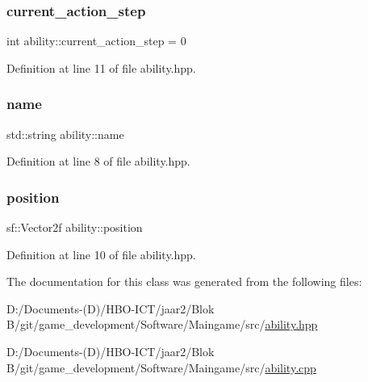 \mbox{\label{classability_a5dbf426e4716c3cc09a8ec0dafb148a0}} 
\subsubsection{\texorpdfstring{current\+\_\+action\+\_\+step}{current\_action\_step}}
{\footnotesize\ttfamily int ability\+::current\+\_\+action\+\_\+step = 0\hspace{0.3cm}{\ttfamily [private]}}



Definition at line 11 of file ability.\+hpp.

\mbox{\label{classability_a0064d2793f684924720a08b059ec2ee0}} 
\subsubsection{\texorpdfstring{name}{name}}
{\footnotesize\ttfamily std\+::string ability\+::name\hspace{0.3cm}{\ttfamily [private]}}



Definition at line 8 of file ability.\+hpp.

\mbox{\label{classability_a36d5b1ac8a8a2df0f1790f3ddf320fad}} 
\subsubsection{\texorpdfstring{position}{position}}
{\footnotesize\ttfamily sf\+::\+Vector2f ability\+::position\hspace{0.3cm}{\ttfamily [private]}}



Definition at line 10 of file ability.\+hpp.



The documentation for this class was generated from the following files\+:\begin{DoxyCompactItemize}
\item 
D\+:/\+Documents-\/(\+D)/\+H\+B\+O-\/\+I\+C\+T/jaar2/\+Blok B/git/game\+\_\+development/\+Software/\+Maingame/src/\hyperlink{ability_8hpp}{ability.\+hpp}\item 
D\+:/\+Documents-\/(\+D)/\+H\+B\+O-\/\+I\+C\+T/jaar2/\+Blok B/git/game\+\_\+development/\+Software/\+Maingame/src/\hyperlink{ability_8cpp}{ability.\+cpp}\end{DoxyCompactItemize}

